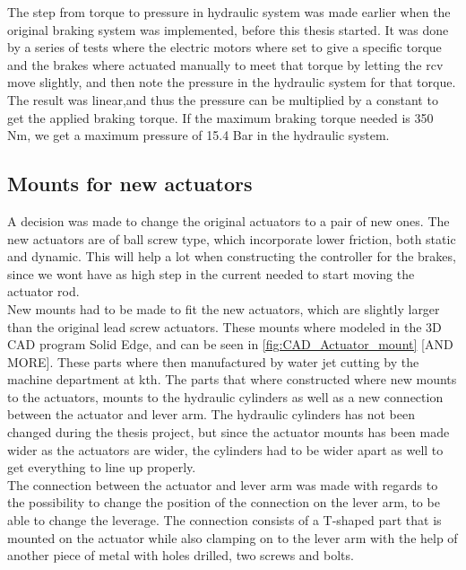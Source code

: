 \documentclass[a4paper,11pt]{kth-mag}
\begin{document}
The step from torque to pressure in hydraulic system was made earlier when the original braking system was implemented, before this thesis started. It was done by a series of tests where the electric motors where set to give a specific torque and the brakes where actuated manually to meet that torque by letting the \gls{rcv} move slightly, and then note the pressure in the hydraulic system for that torque. The result was linear,and thus the pressure can be multiplied by a constant to get the applied braking torque. If the maximum braking torque needed is 350 Nm, we get a maximum pressure of 15.4 Bar in the hydraulic system.


\subsection{Mounts for new actuators}

A decision was made to change the original actuators to a pair of new ones. The new actuators are of ball screw type, which incorporate lower friction, both static and dynamic. This will help a lot when constructing the controller for the brakes, since we wont have as high step in the current needed to start moving the actuator rod. \\

New mounts had to be made to fit the new actuators, which are slightly larger than the original lead screw actuators. These mounts where modeled in the 3D CAD program Solid Edge, and can be seen in \ref{fig:CAD_Actuator_mount} [AND MORE]. These parts where then manufactured by water jet cutting by the machine department at \gls{kth}. The parts that where constructed where new mounts to the actuators, mounts to the hydraulic cylinders as well as a new connection between the actuator and lever arm. The hydraulic cylinders has not been changed during the thesis project, but since the actuator mounts has been made wider as the actuators are wider, the cylinders had to be wider apart as well to get everything to line up properly. \\

The connection between the actuator and lever arm was made with regards to the possibility to change the position of the connection on the lever arm, to be able to change the leverage. The connection consists of a T-shaped part that is mounted on the actuator while also clamping on to the lever arm with the help of another piece of metal with holes drilled, two screws and bolts. \\
\end{document}
